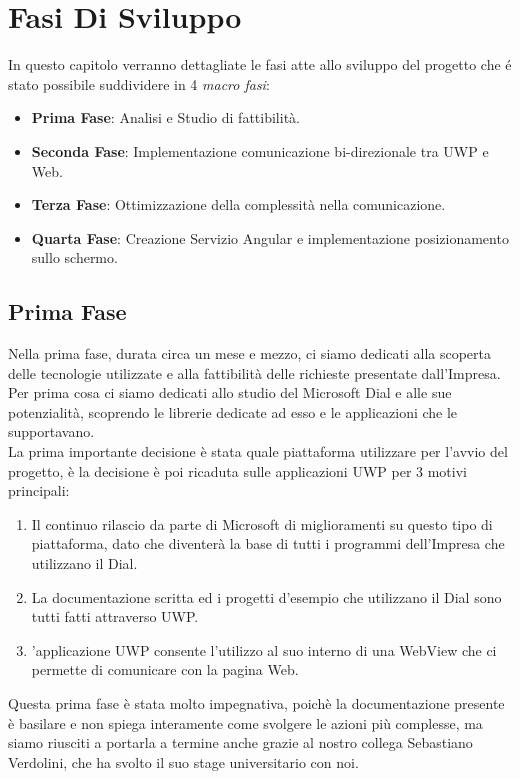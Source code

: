 \chapter{Fasi Di Sviluppo}
\label{chap:fasi}

In questo capitolo verranno dettagliate le fasi atte allo sviluppo del progetto che é stato possibile suddividere in 4 \emph{macro fasi}:

\begin{itemize}
\item \textbf{Prima Fase}: Analisi e Studio di fattibilità.
\item \textbf{Seconda Fase}: Implementazione comunicazione bi-direzionale tra UWP e Web.
\item \textbf{Terza Fase}: Ottimizzazione della complessità nella comunicazione.
\item \textbf{Quarta Fase}: Creazione Servizio Angular e implementazione posizionamento sullo schermo.
\end{itemize}

\section{Prima Fase}
Nella prima fase, durata circa un mese e mezzo, ci siamo dedicati alla scoperta delle tecnologie utilizzate e alla fattibilità delle richieste presentate dall’Impresa. Per prima cosa ci siamo dedicati allo studio del Microsoft Dial e alle sue potenzialità, scoprendo le librerie dedicate ad esso e le applicazioni che le supportavano.
\\

La prima importante decisione è stata quale piattaforma utilizzare per l’avvio del progetto, è la decisione è poi ricaduta sulle applicazioni UWP per 3 motivi principali:
\begin{enumerate}
\item Il continuo rilascio da parte di Microsoft di miglioramenti su questo tipo di piattaforma, dato che diventerà la base di tutti i programmi dell’Impresa che utilizzano il Dial.
\item La documentazione scritta ed i progetti d’esempio che utilizzano il Dial sono tutti fatti attraverso UWP.
\item ’applicazione UWP consente l'utilizzo al suo interno di una WebView che ci permette di comunicare con la pagina Web.
\end{enumerate}


Questa prima fase è stata molto impegnativa, poichè la documentazione presente è basilare e non spiega interamente come svolgere le azioni più complesse, ma siamo riusciti a portarla a termine anche grazie al nostro collega Sebastiano Verdolini, che ha svolto il suo stage universitario con noi.

